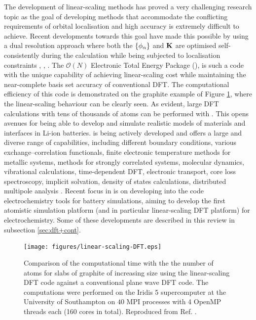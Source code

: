 \documentclass[../main.tex]{subfiles}
\begin{document}
The development of linear-scaling methods has proved a very challenging research topic as the goal of developing methods that accommodate the conflicting requirements of orbital localisation and high accuracy is extremely difficult to achieve. Recent developments towards this goal 
have made this possible by using a dual resolution approach where both the 
$\left\{\phi_\alpha\right\}$ and $\bf K$ are optimised self-consistently
during the calculation while being subjected to localisation constraints 
\cite{ONETEP2005}, \cite{Gillan2007}, \cite{Mohr2015}. 
The $\mathcal{O}(N)$ Electronic Total Energy Package (\onetep),\cite{ONETEP2020} is such a code with the unique capability of 
achieving linear-scaling cost while maintaining the near-complete basis 
set accuracy of conventional DFT.  The computational efficiency of this code
is demonstrated on the  graphite example of Figure \ref{fig:ls}, where the linear-scaling behaviour can be clearly seen. As evident,  large DFT  calculations with tens of thousands of atoms can be performed with \onetep. This opens avenues for being able to develop and simulate realistic models of  materials and interfaces in Li-ion batteries.  \onetep{} is being actively developed
and offers a  large and diverse range of capabilities, including different boundary conditions, various exchange–correlation functionals, finite electronic temperature methods for metallic systems, methods for strongly correlated systems, molecular dynamics, vibrational calculations, time-dependent DFT, electronic transport, core loss spectroscopy, implicit solvation, density of states calculations, distributed multipole analysis \cite{ONETEP2020}. 
Recent focus in \onetep{} is on developing into the code electrochemistry tools for battery simulations, aiming to develop  the first atomistic simulation platform (and in particular linear-scaling DFT platform) for electrochemistry. Some of these developments are described in this review in subsection \ref{sec:dft+cont}.

\begin{figure}
    \centering
    \texttt{[image: figures/linear-scaling-DFT.eps]}
    \caption{Comparison of the computational time with the the number of atoms for slabs of graphite of increasing size
     using the \onetep{} linear-scaling DFT code against  a conventional plane wave DFT code. The computations were performed on the Iridis 5 supercomputer at the University of Southampton on $40$ MPI processes with 4 OpenMP threads each (160 cores in total). Reproduced from Ref. .}
    \label{fig:ls}
\end{figure}
\end{document}
